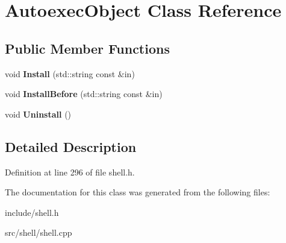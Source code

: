 \hypertarget{classAutoexecObject}{\section{Autoexec\-Object Class Reference}
\label{classAutoexecObject}
}
\subsection*{Public Member Functions}
\begin{DoxyCompactItemize}
\item 
\hypertarget{classAutoexecObject_a30b975e4cf89783c6e56025c60479ca1}{void {\bfseries Install} (std\-::string const \&in)}\label{classAutoexecObject_a30b975e4cf89783c6e56025c60479ca1}

\item 
\hypertarget{classAutoexecObject_a006d09ad8eef5bc34e1d72778a96cce6}{void {\bfseries Install\-Before} (std\-::string const \&in)}\label{classAutoexecObject_a006d09ad8eef5bc34e1d72778a96cce6}

\item 
\hypertarget{classAutoexecObject_a62d93cd9fdbf05b70f05410ae7bb73df}{void {\bfseries Uninstall} ()}\label{classAutoexecObject_a62d93cd9fdbf05b70f05410ae7bb73df}

\end{DoxyCompactItemize}


\subsection{Detailed Description}


Definition at line 296 of file shell.\-h.



The documentation for this class was generated from the following files\-:\begin{DoxyCompactItemize}
\item 
include/shell.\-h\item 
src/shell/shell.\-cpp\end{DoxyCompactItemize}
